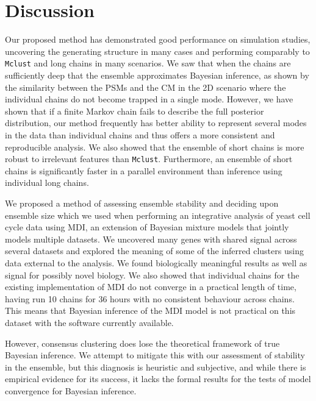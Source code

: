 \documentclass{bmcart}
\begin{document}
	\section*{Discussion}
	Our proposed method has demonstrated good performance on simulation studies, uncovering the generating structure in many cases and performing comparably to \texttt{Mclust} and long chains in many scenarios. We saw that when the chains are sufficiently deep that the ensemble approximates Bayesian inference, as shown by the similarity between the PSMs and the CM in the 2D scenario where the individual chains do not become trapped in a single mode. However, we have shown that if a finite Markov chain fails to describe the full posterior distribution, our method frequently has better ability to represent several modes in the data than individual chains and thus offers a more consistent and reproducible analysis. We also showed that the ensemble of short chains is more robust to irrelevant features than \texttt{Mclust}. Furthermore, an ensemble of short chains is significantly faster in a parallel environment than inference using individual long chains. 
	
	We proposed a method of assessing ensemble stability and deciding upon ensemble size which we used when performing an integrative analysis of yeast cell cycle data using MDI, an extension of Bayesian mixture models that jointly models multiple datasets. 
	We uncovered many genes with shared signal across several datasets and explored the meaning of some of the inferred clusters using data external to the analysis. We found biologically meaningful results as well as signal for possibly novel biology. We also showed that individual chains for the existing implementation of MDI do not converge in a practical length of time, having run 10 chains for 36 hours with no consistent behaviour across chains. This means that Bayesian inference of the MDI model is not practical on this dataset with the software currently available.
	
	However, consensus clustering does lose the theoretical framework of true Bayesian inference. We attempt to mitigate this with our assessment of stability in the ensemble, but this diagnosis is heuristic and subjective, and while there is empirical evidence for its success, it lacks the formal results for the tests of model convergence for Bayesian inference.
	
\end{document}
